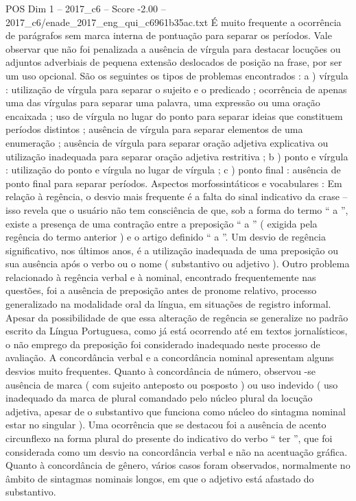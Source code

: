 \begin{textsample}{POS Dim 1 – 2017\_c6 – Score -2.00 – 2017\_c6/enade\_2017\_eng\_qui\_c6961b35ac.txt}
É muito frequente a ocorrência de parágrafos sem marca interna de pontuação para separar os períodos.
Vale observar que não foi penalizada a ausência de vírgula para destacar locuções ou adjuntos adverbiais de pequena extensão deslocados de posição na frase, por ser um uso opcional.
São os seguintes os tipos de problemas encontrados : a ) vírgula : utilização de vírgula para separar o sujeito e o predicado ; ocorrência de apenas uma das vírgulas para separar uma palavra, uma expressão ou uma oração encaixada ; uso de vírgula no lugar do ponto para separar ideias que constituem períodos distintos ; ausência de vírgula para separar elementos de uma enumeração ; ausência de vírgula para separar oração adjetiva explicativa ou utilização inadequada para separar oração adjetiva restritiva ; b ) ponto e vírgula : utilização do ponto e vírgula no lugar de vírgula ; c ) ponto final : ausência de ponto final para separar períodos.
Aspectos morfossintáticos e vocabulares : Em relação à regência, o desvio mais frequente é a falta do sinal indicativo da crase – isso revela que o usuário não tem consciência de que, sob a forma do termo “ a ”, existe a presença de uma contração entre a preposição “ a ” ( exigida pela regência do termo anterior ) e o artigo definido “ a ”.
Um desvio de regência significativo, nos últimos anos, é a utilização inadequada de uma preposição ou sua ausência após o verbo ou o nome ( substantivo ou adjetivo ).
Outro problema relacionado à regência verbal e à nominal, encontrado frequentemente nas questões, foi a ausência de preposição antes de pronome relativo, processo generalizado na modalidade oral da língua, em situações de registro informal.
Apesar da possibilidade de que essa alteração de regência se generalize no padrão escrito da Língua Portuguesa, como já está ocorrendo até em textos jornalísticos, o não emprego da preposição foi considerado inadequado neste processo de avaliação.
A concordância verbal e a concordância nominal apresentam alguns desvios muito frequentes.
Quanto à concordância de número, observou -se ausência de marca ( com sujeito anteposto ou posposto ) ou uso indevido ( uso inadequado da marca de plural comandado pelo núcleo plural da locução adjetiva, apesar de o substantivo que funciona como núcleo do sintagma nominal estar no singular ).
Uma ocorrência que se destacou foi a ausência de acento circunflexo na forma plural do presente do indicativo do verbo “ ter ”, que foi considerada como um desvio na concordância verbal e não na acentuação gráfica.
Quanto à concordância de gênero, vários casos foram observados, normalmente no âmbito de sintagmas nominais longos, em que o adjetivo está afastado do substantivo.

\end{textsample}
